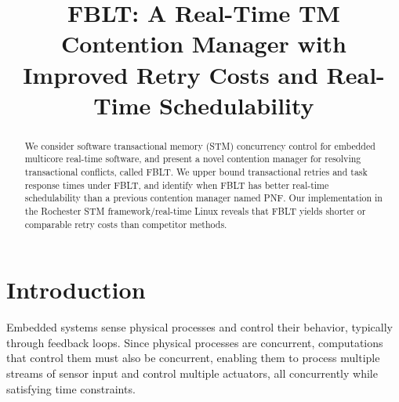 \documentclass[conference]{IEEEtran}
\begin{document}
%

\title{FBLT: A Real-Time TM Contention Manager with Improved Retry Costs and Real-Time Schedulability}


\author{
\and
{}
}

\maketitle


\begin{abstract}
We consider software transactional memory (STM) concurrency control for embedded multicore real-time software, and present a novel contention manager for resolving transactional conflicts, called FBLT. We upper bound transactional retries and task response times under FBLT, and identify when FBLT has better real-time schedulability than a previous contention manager 
named PNF. 
Our implementation in the Rochester STM framework/real-time Linux reveals that FBLT yields shorter or comparable retry costs than competitor methods.
\end{abstract}


\IEEEpeerreviewmaketitle


\section{Introduction}

\label{sec:intro}

Embedded systems sense physical processes and control their behavior, typically through feedback loops. Since physical processes are concurrent, computations that control them must also be concurrent, enabling them to process multiple streams of sensor input and control multiple actuators, all concurrently while satisfying time constraints. 
\end{document}
